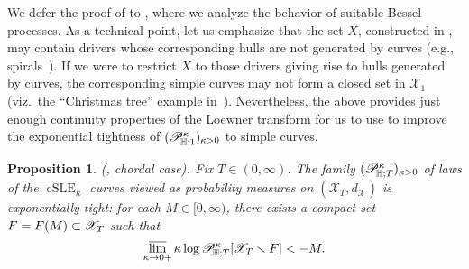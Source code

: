 \documentclass[a4paper, 11pt]{article}
\newtheorem{prop}[thm]{Proposition}
\theoremstyle{definition}
\numberwithin{equation}{section}
\numberwithin{figure}{section}
\renewcommand{\limsup}{\varlimsup}
\newcommand{\cSLE}[1][]{\operatorname{cSLE}_{#1}}
\newcommand{\Hpaths}[1][]{\mathscr{X}_{#1}} %
\newcommand{\dHpaths}[1][]{d_{\!\Hpaths[#1]}}
\newcommand{\cHmeasure}[2][]{\mathscr{P}^{#2}_{\!\bH;#1}}
\begin{document}
We defer the proof of  to , where we analyze the behavior of suitable Bessel processes. 
As a technical point, let us emphasize that the set $X$, 
constructed in , 
may contain drivers whose corresponding hulls are not generated by curves 
(e.g., spirals~\cite[Section~5.4, Figure~5.9]{Beliaev:Conformal_maps_and_geometry}). 
If we were to restrict $X$ to those drivers giving rise to hulls generated by curves, 
the corresponding simple curves may not form a closed set in $\Hpaths[1]$ 
(viz.~the ``Christmas tree'' example in~\cite[Figure~6.1]{Kemppainen:SLE_book}). 
Nevertheless, the above  provides just enough continuity properties of the Loewner transform for us to use  
to improve the exponential tightness of $(\cHmeasure[1]{\kappa})_{\kappa > 0}$ to simple curves.


\begin{prop} \label{thm:exponential-tightness-chordal}
\textnormal{(, chordal case){\bf.}}
Fix $T \in (0,\infty)$. 
The family $(\cHmeasure[T]{\kappa})_{\kappa > 0}$ of laws of the $\cSLE[\kappa]$ curves viewed as probability measures on $(\Hpaths[T],\dHpaths)$ is exponentially tight:
for each $M \in [0,\infty)$, there exists a compact set $\compact = \compact(M) \subset \Hpaths[T]$ such that
\begin{align*}
\limsup_{\kappa \to 0+}\kappa\log\cHmeasure[T]{\kappa}[\Hpaths[T] \smallsetminus \compact] < -M.
\end{align*}
\end{prop}
\end{document}
